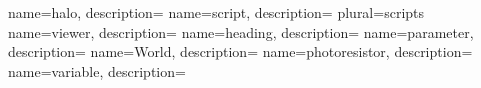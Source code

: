 

		{name={halo}, 
		description={}}
		{name={script}, 
		description={}
		plural={scripts}}
		{name={viewer}, 
		description={}}
		{name={heading}, 
		description={}}
		{name={parameter}, 
		description={}}
		{name={World}, 
		description={}}
		{name={photoresistor}, 
		description={}}
		{name={variable}, 
		description={}}
